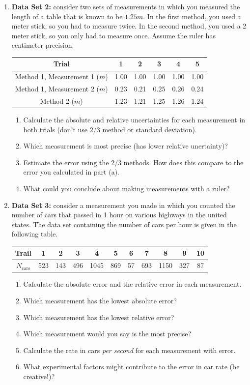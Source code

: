 \begin{enumerate}
\item {\bf{Data Set 2:}} consider two sets of measurements in which you measured the length of a table that is known to be $1.25 m$. In the first method, you used a meter stick, so you had to measure twice. In the second method, you used a 2 meter stick, so you only had to measure once. Assume the ruler has centimeter precision.
\begin{center}
\begin{tabular}{ |c | c | c | c | c | c |}
\hline
Trial &1&2&3&4&5 \\ \hline
Method 1, Measurement 1 ($m$) & 1.00 & 1.00 & 1.00 &1.00 &1.00 \\
\hline
Method 1, Measurement 2  ($m$)& 0.23 &0.21&0.25&0.26&0.24 \\
\hline
Method 2 ($m$)& 1.23&1.21&1.25&1.26&1.24 \\
\hline
\end{tabular}
\end{center}
\begin{enumerate}
\item Calculate the absolute and relative uncertainties for each measurement in both trials (don't use 2/3 method or standard deviation).
\item Which measurement is most precise (has lower relative unertainty)?
\item Estimate the error using the 2/3 methods. How does this compare to the error you calculated in part (a).
\item What could you conclude about making measurements with a ruler?
\end{enumerate}

\item {\bf{Data Set 3:}} consider a measurement you made in which you counted the number of cars that passed in 1 hour on various highways in the united states. The data set containing the number of cars per hour is given in the following table.
\begin{center}
\begin{tabular}{|c | c | c | c | c | c | c | c | c | c | c|}
\hline
Trail&1&2&3&4&5&6&7&8&9&10 \\ \hline
$N_{\text{cars}}$&523&143&496&1045&869&57&693&1150&327&87 \\
\hline
\end{tabular}
\end{center}
\begin{enumerate}
\item Calculate the absolute error and the relative error in each measurement.
\item Which measurement has the lowest absolute error?
\item Which measurement has the lowest relative error?
\item Which measurement would you say is the most precise?
\item Calculate the rate in cars {\it{per second}} for each measurement with error.
\item What experimental factors might contribute to the error in car rate (be creative!)?
\end{enumerate}
\end{enumerate}

